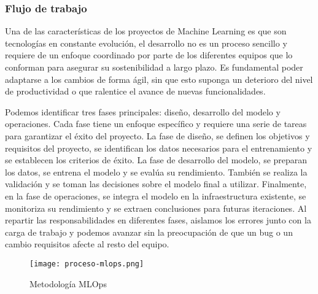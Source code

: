 \subsubsection{Flujo de trabajo}
Una de las características de los proyectos de Machine Learning es que son tecnologías en constante evolución, el
desarrollo no es un proceso sencillo y requiere de un enfoque coordinado por parte de los diferentes
equipos que lo conforman para asegurar su sostenibilidad a largo plazo. Es fundamental poder adaptarse a los cambios
de forma ágil, sin que esto suponga un deterioro del nivel de productividad o que ralentice el avance de nuevas
funcionalidades.\medskip

Podemos identificar tres fases principales: diseño, desarrollo del modelo y operaciones. Cada fase tiene un enfoque
específico y requiere una serie de tareas para garantizar el éxito del proyecto. La fase de diseño,
se definen los objetivos y requisitos del proyecto, se identifican los datos necesarios para el entrenamiento y
se establecen los criterios de éxito. La fase de desarrollo del modelo, se preparan los datos, se entrena el modelo
y se evalúa su rendimiento. También se realiza la validación y se toman las decisiones sobre el modelo final a utilizar.
Finalmente, en la fase de operaciones, se integra el modelo en la infraestructura existente, se monitoriza su rendimiento
y se extraen conclusiones para futuras iteraciones. Al repartir las responsabilidades en diferentes fases, aislamos los 
errores junto con la carga de trabajo y podemos avanzar sin la preocupación de que un bug o un cambio requisitos 
afecte al resto del equipo.\medskip

\begin{figure}[ht]
    \centering
    \texttt{[image: proceso-mlops.png]}
    \caption{Metodología MLOps}
    \label{fig:proces-mlops}
\end{figure}